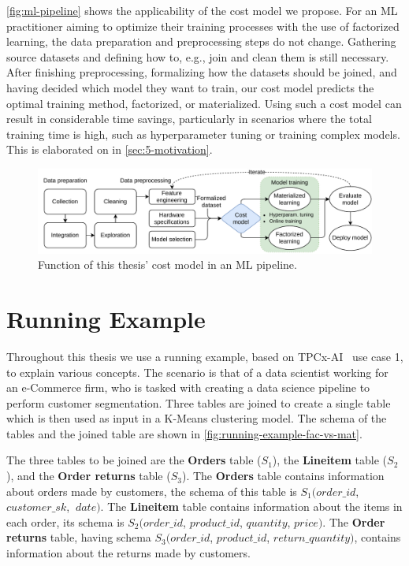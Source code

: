\autoref{fig:ml-pipeline} shows the applicability of the cost model we propose. For an ML practitioner aiming to optimize their training processes with the use of factorized learning, the data preparation and preprocessing steps do not change. Gathering source datasets and defining how to, e.g., join and clean them is still necessary. After finishing preprocessing, formalizing how the datasets should be joined, and having decided which model they want to train, our cost model predicts the optimal training method, factorized, or materialized. Using such a cost model can result in considerable time savings, particularly in scenarios where the total training time is high,  such as hyperparameter tuning or training complex models. This is elaborated on in \autoref{sec:5-motivation}.

\begin{figure}[ht]
  \centering
  \includegraphics[width=0.95\linewidth]{chapters/01_introduction/figures/ML-Pipeline.pdf}
  \caption{Function of this thesis' cost model in an ML pipeline.}
  \label{fig:ml-pipeline}
\end{figure}

\section{Running Example}
Throughout this thesis we use a running example, based on TPCx-AI~\cite{tpcx-ai} use case 1, to explain various concepts. The scenario is that of a data scientist working for an e-Commerce firm, who is tasked with creating a data science pipeline to perform customer segmentation. Three tables are joined to create a single table which is then used as input in a K-Means clustering model. The schema of the tables and the joined table are shown in \autoref{fig:running-example-fac-vs-mat}.

The three tables to be joined are the \textbf{Orders} table ($S_1$), the \textbf{Lineitem} table ($S_2$), and the \textbf{Order returns} table ($S_3$). The \textbf{Orders} table contains information about orders made by customers, the schema of this table is $S_1(order\_id$, $customer\_sk$, $\ date)$. The \textbf{Lineitem} table contains information about the items in each order, its schema is $S_2(order\_id$, $product\_id$, $quantity$,  $price)$. The \textbf{Order returns} table, having schema $S_3(order\_id$, $product\_id$, $return\_quantity)$, contains information about the returns made by customers.

